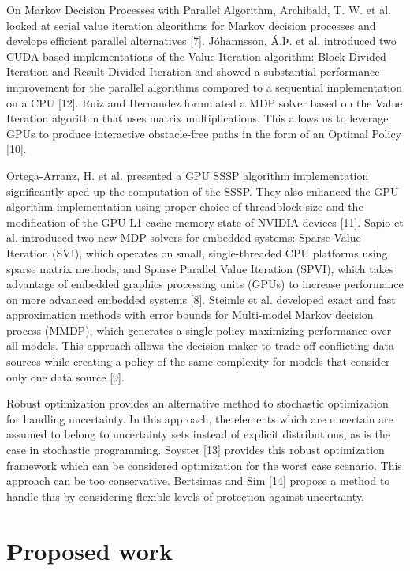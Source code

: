 \documentclass{article}
\begin{document}
On Markov Decision Processes with Parallel Algorithm, Archibald, T. W. et al. looked at serial value iteration algorithms for Markov decision processes and develops efficient parallel alternatives [7]. 
Jóhannsson, Á.Þ. et al. introduced two CUDA-based implementations of the Value Iteration algorithm: Block Divided Iteration and Result Divided Iteration 
and showed a substantial performance improvement for the parallel algorithms compared to a sequential implementation 
on a CPU [12]. Ruiz and Hernandez formulated a MDP solver based on the Value Iteration algorithm that uses matrix 
multiplications. This allows us to leverage GPUs to produce interactive obstacle-free paths in the form of an Optimal Policy [10]. 

Ortega-Arranz, H. et al. presented a GPU SSSP algorithm implementation  significantly sped up the computation of the SSSP. They also enhanced the GPU 
algorithm implementation using proper choice of threadblock size and the modification of the GPU L1 cache memory state of 
NVIDIA devices [11]. Sapio et al. introduced two new MDP solvers for embedded 
systems: Sparse Value Iteration (SVI), which operates on small, single-threaded CPU platforms using sparse matrix methods, 
and Sparse Parallel Value Iteration (SPVI), which takes advantage of embedded graphics processing units (GPUs) to increase 
performance on more advanced embedded systems [8]. Steimle et al. developed exact and fast approximation methods with error bounds 
for Multi-model Markov decision process (MMDP), which generates a single policy maximizing performance over all models. 
This approach allows the decision maker to trade-off conflicting data sources while creating a policy of the same complexity 
for models that consider only one data source [9]. 

Robust optimization provides an alternative method to stochastic optimization for handling uncertainty. In this approach, the elements which are uncertain are assumed to belong to uncertainty sets instead of explicit distributions, as is the case in stochastic programming. Soyster [13] provides this robust optimization framework which can be considered optimization for the worst case scenario. This approach can be too conservative. Bertsimas and Sim [14] propose a method to handle this by considering flexible levels of protection against uncertainty.

\section{Proposed work}
\end{document}
